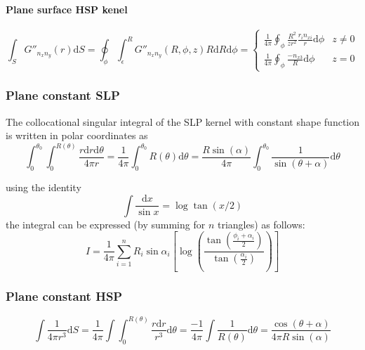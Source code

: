 \documentclass[a4paper,11pt]{article}
\newcommand{\td}{\mathrm{d}}
\begin{document}
\paragraph {Plane surface HSP kenel}

\begin{equation}
		\int_{S}
			G''_{n_x n_y}(r)
		\td S
		=
		\oint_{\phi}
		\int_{\epsilon}^{R}
			G''_{n_x n_y}(R, \phi, z) R
		\td R
		\td \phi
		=
		\begin{cases}
		\frac{1}{4\pi}
		\oint_{\phi}
			\frac{R^2}{z r^2} \frac{r_i n_{xi}}{r}
		\td \phi  & z \ne 0 \\
				\frac{1}{4\pi}
		\oint_{\phi}
			\frac{-n_{x3}}{R}
		\td \phi &z = 0
		\end{cases}
\end{equation}


\subsubsection{Plane constant SLP}

The collocational singular integral of the SLP kernel with constant shape function is written in polar coordinates as
%
\begin{equation}
\int_0^{\theta_0} \int_0^{R(\theta)} \frac{r \td r \td \theta}{4\pi r}
=
\frac{1}{4\pi}\int_0^{\theta_0} R(\theta) \td \theta
=
\frac{R \sin(\alpha)}{4\pi}\int_0^{\theta_0} \frac{1}{\sin(\theta+\alpha)} \td \theta
\end{equation}

%
using the identity
%
\begin{equation}
\int \frac{\td x}{\sin x} = \log \tan (x/2)
\end{equation}
%
the integral can be expressed (by summing for $n$ triangles) as follows:
%
\begin{equation}
I = \frac{1}{4\pi} \sum_{i = 1}^n
R_i \sin\alpha_i \left[ \log \left( \frac{\tan\left(\frac{\phi_i+\alpha_i}{2}\right)}{\tan\left(\frac{\alpha_i}{2}\right)}\right)\right]
\end{equation}

\subsubsection{Plane constant HSP}

\begin{equation}
	\int \frac{1}{4\pi r^3} \td S
	= \frac{1}{4\pi}\int \int_{0}^{R(\theta)} \frac{r \td r}{r^3} \td \theta
	= \frac{-1}{4\pi}\int \frac{1}{R(\theta)} \td \theta
	= \frac{\cos(\theta+\alpha)}{4\pi R \sin(\alpha)}
\end{equation}
\end{document}
